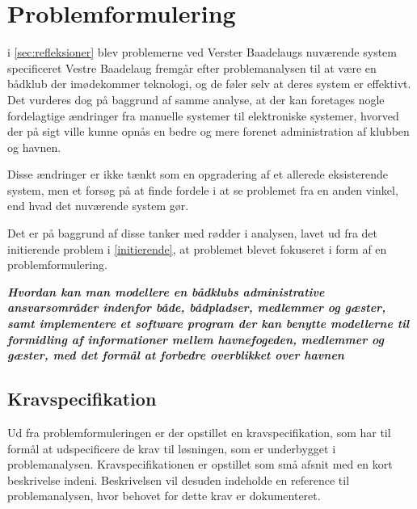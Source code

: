 \chapter{Problemformulering}
\label{cha:problemformulering}

i \cref{sec:refleksioner} blev problemerne ved Verster Baadelaugs nuværende system specificeret 
Vestre Baadelaug fremgår efter problemanalysen til at være en bådklub der imødekommer teknologi, og de føler selv at deres system er effektivt. Det vurderes dog på baggrund af samme analyse, at der kan foretages nogle fordelagtige ændringer fra manuelle systemer til elektroniske systemer, hvorved der på sigt ville kunne opnås en bedre og mere forenet administration af klubben og havnen.

Disse ændringer er ikke tænkt som en opgradering af et allerede eksisterende system, men et forsøg på at finde fordele i at se problemet fra en anden vinkel, end hvad det nuværende system gør.

Det er på baggrund af disse tanker med rødder i analysen, lavet ud fra det initierende problem i \cref{initierende}, at problemet blevet fokuseret i form af en problemformulering. 

\begin{displayquote}
\textbf{\textit{Hvordan kan man modellere en bådklubs administrative ansvarsområder indenfor både, bådpladser, medlemmer og gæster, samt implementere et software program der kan benytte modellerne til formidling af informationer mellem havnefogeden, medlemmer og gæster, med det formål at forbedre overblikket over havnen}}
\end{displayquote}

\section{Kravspecifikation} %
\label{sec:Kravspecifikation}

Ud fra problemformuleringen er der opstillet en kravspecifikation, som har til formål at udspecificere de krav til løsningen, som er underbygget i problemanalysen. Kravspecifikationen er opstillet som små afsnit med en kort beskrivelse indeni. Beskrivelsen vil desuden indeholde en reference til problemanalysen, hvor behovet for dette krav er dokumenteret.
 



